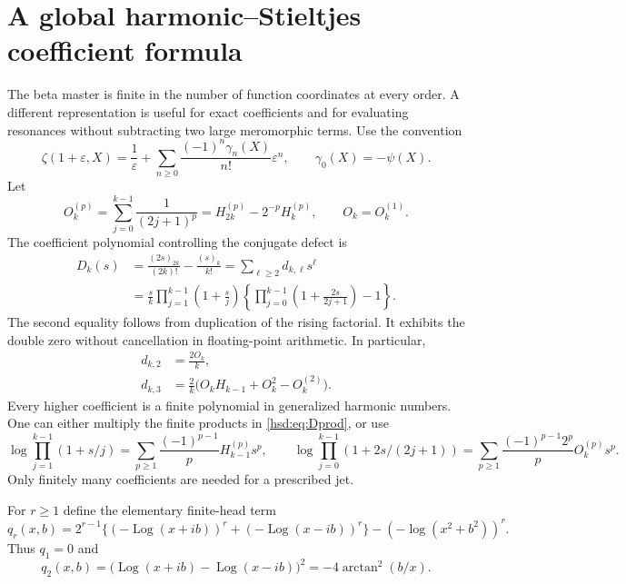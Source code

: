 \documentclass[11pt]{article}
\numberwithin{equation}{section}
\theoremstyle{definition}\newtheorem{definition}[theorem]{Definition}
\theoremstyle{remark}\newtheorem{remark}[theorem]{Remark}
\DeclareMathOperator{\Log}{Log}
\begin{document}
\section{A global harmonic--Stieltjes coefficient formula}
\label{hsd:sec:stieltjes}
The beta master is finite in the number of function coordinates at every
order. A different representation is useful for exact coefficients and
for evaluating resonances without subtracting two large meromorphic terms.
Use the convention
\begin{equation}\label{hsd:eq:Stieltjes}
 \zeta(1+\varepsilon,X)=\frac1\varepsilon+
 \sum_{n\ge0}\frac{(-1)^n\gamma_n(X)}{n!}\varepsilon^n,
 \qquad \gamma_0(X)=-\psi(X).
\end{equation}
Let
\begin{equation}\label{hsd:eq:oddH}
 O_k^{(p)}=\sum_{j=0}^{k-1}\frac1{(2j+1)^p}
 =H_{2k}^{(p)}-2^{-p}H_k^{(p)},\qquad O_k=O_k^{(1)}.
\end{equation}
The coefficient polynomial controlling the conjugate defect is
\begin{align}
 D_k(s)&=\frac{(2s)_{2k}}{(2k)!}-\frac{(s)_k}{k!}
       =\sum_{\ell\ge2}d_{k,\ell}s^\ell\label{hsd:eq:D}\\
 &=\frac{s}{k}\prod_{j=1}^{k-1}\left(1+\frac{s}{j}\right)
 \left\{\prod_{j=0}^{k-1}\left(1+\frac{2s}{2j+1}\right)-1\right\}.
 \label{hsd:eq:Dprod}
\end{align}
The second equality follows from duplication of the rising factorial.
It exhibits the double zero without cancellation in floating-point
arithmetic. In particular,
\begin{align}
 d_{k,2}&=\frac{2O_k}{k},\label{hsd:eq:d2}\\
 d_{k,3}&=\frac2k\bigl(O_kH_{k-1}+O_k^2-O_k^{(2)}\bigr).
 \label{hsd:eq:d3}
\end{align}
Every higher coefficient is a finite polynomial in generalized harmonic
numbers. One can either multiply the finite products in
\eqref{hsd:eq:Dprod}, or use
\[
 \log\prod_{j=1}^{k-1}(1+s/j)
 =\sum_{p\ge1}\frac{(-1)^{p-1}}pH_{k-1}^{(p)}s^p,
 \qquad
 \log\prod_{j=0}^{k-1}(1+2s/(2j+1))
 =\sum_{p\ge1}\frac{(-1)^{p-1}2^p}pO_k^{(p)}s^p.
\]
Only finitely many coefficients are needed for a prescribed jet.

For $r\ge1$ define the elementary finite-head term
\begin{equation}\label{hsd:eq:qr}
 q_r(x,b)=2^{r-1}\{(-\Log(x+ib))^r+(-\Log(x-ib))^r\}
                   -(-\log(x^2+b^2))^r.
\end{equation}
Thus $q_1=0$ and
\begin{equation}\label{hsd:eq:q2}
 q_2(x,b)=\bigl(\Log(x+ib)-\Log(x-ib)\bigr)^2
        =-4\arctan^2(b/x).
\end{equation}
\end{document}
